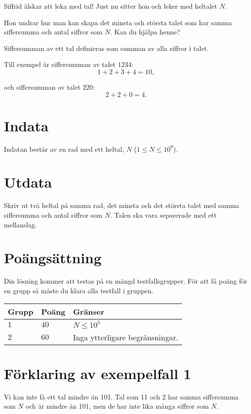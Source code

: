 \noindent
Siffrid älskar att leka med tal! Just nu sitter hon och leker med heltalet $N$.

Hon undrar hur man kan skapa det minsta och största talet som har samma siffersumma och antal siffror som $N$.
Kan du hjälpa henne?

Siffersumman av ett tal definieras som summan av alla siffror i talet. 

\noindent
Till exempel är siffersumman av talet $1234$: 
$$
1 + 2 + 3 + 4 = 10,
$$

och siffersumman av talet $220$:
$$
2 + 2 + 0 = 4.
$$


\section*{Indata}
Indatan består av en rad med ett heltal, $N$ ($1 \le N \le 10^9$).

\section*{Utdata}
Skriv ut två heltal på samma rad, det minsta och det största talet med samma siffersumma och antal siffror som $N$.
Talen ska vara separerade med ett mellanslag.

\section*{Poängsättning}
Din lösning kommer att testas på en mängd testfallsgrupper.
För att få poäng för en grupp så måste du klara alla testfall i gruppen.

\noindent
\begin{tabular}{| l | l | p{12cm} |}
  \hline
  \textbf{Grupp} & \textbf{Poäng} & \textbf{Gränser} \\ \hline
  $1$    & $40$       & $N \leq 10^5$ \\ \hline
  $2$    & $60$       & Inga ytterligare begränsningar. \\ \hline
\end{tabular}

\section*{Förklaring av exempelfall 1}
Vi kan inte få ett tal mindre än 101. Tal som 11 och 2 har samma siffersumma som $N$ och är mindre än 101, men de har inte
lika många siffror som $N$.
